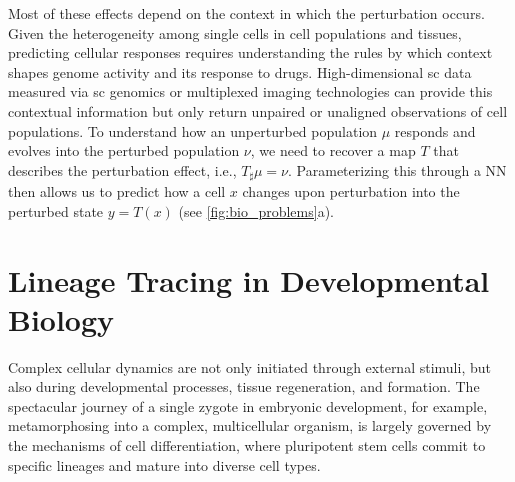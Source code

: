 Most of these effects depend on the context in which the perturbation occurs. Given the heterogeneity among single cells in cell populations and tissues, predicting cellular responses requires understanding the rules by which context shapes genome activity and its response to drugs. High-dimensional \acrlong{sc} data measured via \acrlong{sc} genomics or multiplexed imaging technologies can provide this contextual information but only return unpaired or unaligned observations of cell populations.
To understand how an unperturbed population $\mu$ responds and evolves into the perturbed population $\nu$, we need to recover a map $T$ that describes the perturbation effect, i.e., $T_\sharp \mu = \nu$. Parameterizing this through a \acrlong{NN} then allows us to predict how a cell $x$ changes upon perturbation into the perturbed state $y= T(x)$ (see \cref{fig:bio_problems}a).



\section{Lineage Tracing in Developmental Biology}
\label{sec:cell_differentiation}

Complex cellular dynamics are not only initiated through external stimuli, but also during developmental processes, tissue regeneration, and formation.
The spectacular journey of a single zygote in embryonic development, for example, metamorphosing into a complex, multicellular organism, is largely governed by the mechanisms of cell differentiation, where pluripotent stem cells commit to specific lineages and mature into diverse cell types.

